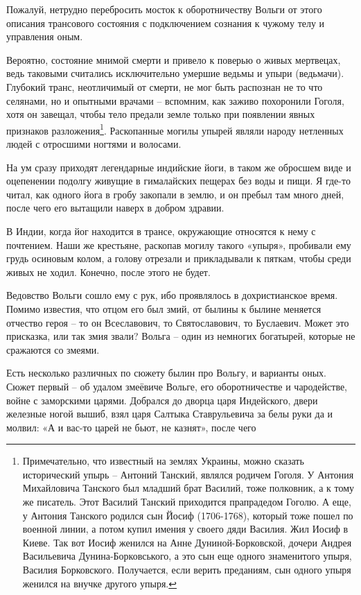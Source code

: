 Пожалуй, нетрудно перебросить мосток к оборотничеству Вольги от этого описания трансового состояния с подключением сознания к чужому телу и управления оным.

Вероятно, состояние мнимой смерти и привело к поверью о живых мертвецах, ведь таковыми считались исключительно умершие ведьмы и упыри (ведьмачи). Глубокий транс, неотличимый от смерти, не мог быть распознан не то что селянами, но и опытными врачами – вспомним, как заживо похоронили Гоголя, хотя он завещал, чтобы тело предали земле только при появлении явных признаков разложения\footnote{Примечательно, что известный на землях Украины, можно сказать исторический упырь – Антоний Танский, являлся родичем Гоголя. У Антония Михайловича Танского был младший брат Василий, тоже полковник, а к тому же писатель. Этот Василий Танский приходится прапрадедом Гоголю. А еще, у Антония Танского родился сын Йосиф (1706-1768), который тоже пошел по военной линии, а потом купил имения у своего дяди Василия. Жил Иосиф в Киеве. Так вот Иосиф женился на Анне Дуниной-Борковской, дочери Андрея Васильевича Дунина-Борковського, а это сын еще одного знаменитого упыря, Василия Борковского. Получается, если верить преданиям, сын одного упыря женился на внучке другого упыря.}. Раскопанные могилы упырей являли народу нетленных людей с отросшими ногтями и волосами.

На ум сразу приходят легендарные индийские йоги, в таком же обросшем виде и оцепенении подолгу живущие в гималайских пещерах без воды и пищи. Я где-то читал, как одного йога в гробу закопали в землю, и он пребыл там много дней, после чего его вытащили наверх в добром здравии.

В Индии, когда йог находится в трансе, окружающие относятся к нему с почтением. Наши же крестьяне, раскопав могилу такого «упыря», пробивали ему грудь осиновым колом, а голову отрезали и прикладывали к пяткам, чтобы среди живых не ходил. Конечно, после этого не будет.

Ведовство Вольги сошло ему с рук, ибо проявлялось в дохристианское время. Помимо известия, что отцом его был змий, от былины к былине меняется отчество героя – то он Всеславович, то Святославович, то Буслаевич. Может это присказка, или так змия звали? Вольга – один из немногих богатырей, которые не сражаются со змеями.

Есть несколько различных по сюжету былин про Вольгу, и варианты оных. Сюжет первый – об удалом змеёвиче Вольге, его оборотничестве и чародействе, войне с заморскими царями. Добрался до дворца царя Индейского, двери железные ногой вышиб, взял царя Салтыка Ставрульевича за белы руки да и молвил: «А и вас-то царей не бьют, не казнят», после чего 

